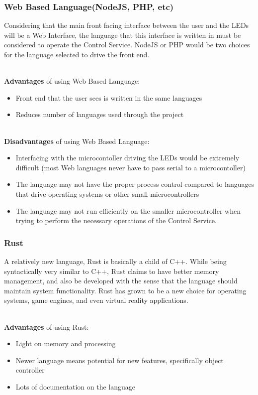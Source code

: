 		\subsubsection{Web Based Language(NodeJS, PHP, etc)}
		Considering that the main front facing interface between the user and the LEDs will be a Web Interface, the language that this interface is written in must be considered to operate
		the Control Service.  NodeJS or PHP would be two choices for the language selected to drive the front end.

		\noindent \\ \textbf{Advantages} of using Web Based Language:
		\begin{itemize}
			\item Front end that the user sees is written in the same languages
			\item Reduces number of languages used through the project
		\end{itemize}

		\noindent \\ \textbf{Disadvantages} of using Web Based Language:
		\begin{itemize}
			\item Interfacing with the microcontoller driving the LEDs would be extremely difficult (most Web languages never have to pass serial to a microcontoller)
			\item The language may not have the proper process control compared to languages that drive operating systems or other small microcontrollers
			\item The language may not run efficiently on the smaller microcontroller when trying to perform the necessary operations of the Control Service.
		\end{itemize}


		\subsubsection{Rust}
		A relatively new language, Rust is basically a child of C++.  While being syntactically very similar to C++, Rust claims to have better memory management, and also be developed with the
		sense that the language should maintain system functionality.  Rust has grown to be a new choice for operating systems, game engines, and even virtual reality applications. \cite{LANG2}

		\noindent \\ \textbf{Advantages} of using Rust:
		\begin{itemize}
			\item Light on memory and processing
			\item Newer language means potential for new features, specifically object controller
			\item Lots of documentation on the language
		\end{itemize}

